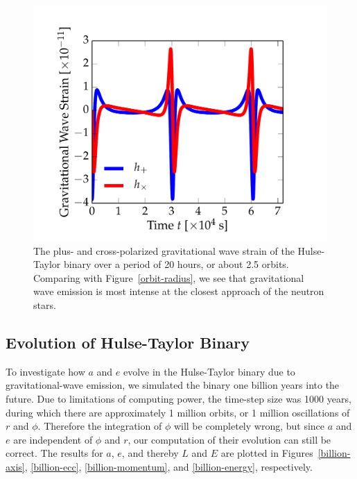 \documentclass[preprint2]{aastex}
\begin{document}
\begin{figure}[t!]
\centering
\hspace*{-1cm}\includegraphics[width=1.2\textwidth]{orbit_figs/gw-strain.pdf}
\caption{The plus- and cross-polarized gravitational wave strain of the Hulse-Taylor binary over a period of 20 hours, or about 2.5 orbits. Comparing with Figure~\ref{orbit-radius}, we see that gravitational wave emission is most intense at the closest approach of the neutron stars.}
\label{orbit-strain}
\end{figure}

\subsection{Evolution of Hulse-Taylor Binary}

To investigate how \(a\) and \(e\) evolve in the Hulse-Taylor binary due to gravitational-wave emission, we simulated the binary one billion years into the future. Due to limitations of computing power, the time-step size was 1000 years, during which there are approximately 1 million orbits, or 1 million oscillations of \(r\) and \(\phi\). Therefore the integration of \(\phi\) will be completely wrong, but since \(a\) and \(e\) are independent of \(\phi\) and \(r\), our computation of their evolution can still be correct. The results for \(a\), \(e\), and thereby \(L\) and \(E\) are plotted in Figures~\ref{billion-axis}, \ref{billion-ecc}, \ref{billion-momentum}, and \ref{billion-energy}, respectively.
\end{document}
